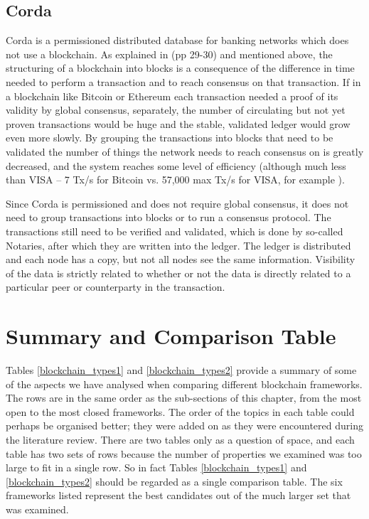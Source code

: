 \subsection{Corda}
Corda \cite{Hearn2016} is a permissioned distributed database for banking networks which does not use a blockchain. As explained  in \cite{Hearn2016} (pp 29-30) and mentioned above, the structuring of a blockchain into blocks is a consequence of the difference in time needed to perform a transaction and to reach consensus on that transaction. If in a blockchain like Bitcoin or Ethereum each transaction needed a proof of its validity by global consensus, separately, the number of circulating but not yet proven transactions would be huge and the stable, validated ledger would grow even more slowly. By grouping the transactions into blocks that need to be validated the number of things the network needs to reach consensus on is greatly decreased, and the system reaches some level of efficiency (although much less than VISA -- 7 Tx/s for Bitcoin vs. 57,000 max Tx/s for VISA, for example \cite{Antonopoulos2015}).

Since Corda is permissioned and does not require global consensus, it does not need to group transactions into blocks or to run a consensus protocol. The transactions still need to be verified and validated, which is done by so-called Notaries, after which they are written into the ledger. The ledger is distributed and each node has a copy, but not all nodes see the same information. Visibility of the data is strictly related to whether or not the data is directly related to a particular peer or counterparty in the transaction.

\section{Summary and Comparison Table}
Tables \ref{blockchain_types1} and \ref{blockchain_types2} provide a summary of some of the aspects we have analysed when comparing different blockchain frameworks. The rows are in the same order as the sub-sections of this chapter, from the most open to the most closed frameworks. The order of the topics in each table could perhaps be organised better; they were added on as they were encountered during the literature review. There are two tables only as a question of space, and each table has two sets of rows because the number of properties we examined was too large to fit in a single row. So in fact Tables \ref{blockchain_types1} and \ref{blockchain_types2} should be regarded as a single comparison table. The six frameworks listed represent the best candidates out of the much larger set that was examined.

